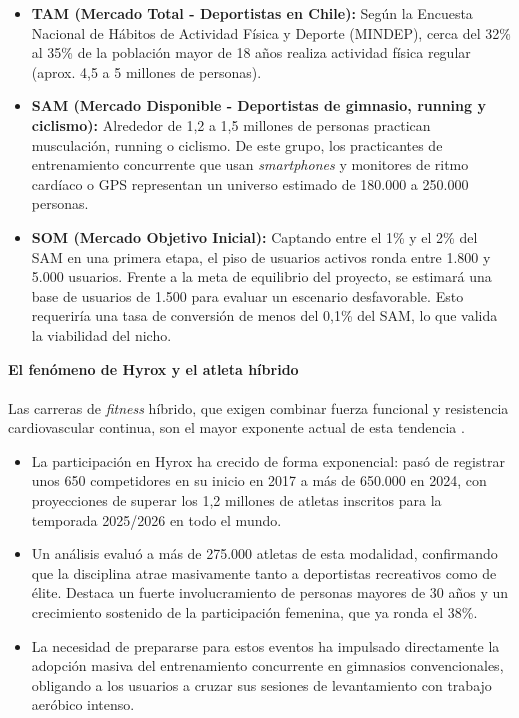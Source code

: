 \documentclass[12pt]{article}
\begin{document}
\begin{itemize}
    \item \textbf{TAM (Mercado Total - Deportistas en Chile):} Según la Encuesta Nacional de Hábitos de Actividad Física y Deporte (MINDEP), cerca del 32\% al 35\% de la población mayor de 18 años realiza actividad física regular (aprox. 4,5 a 5 millones de personas).
    \item \textbf{SAM (Mercado Disponible - Deportistas de gimnasio, running y ciclismo):} Alrededor de 1,2 a 1,5 millones de personas practican musculación, running o ciclismo. De este grupo, los practicantes de entrenamiento concurrente que usan \textit{smartphones} y monitores de ritmo cardíaco o GPS representan un universo estimado de 180.000 a 250.000 personas.
    \item \textbf{SOM (Mercado Objetivo Inicial):} Captando entre el 1\% y el 2\% del SAM en una primera etapa, el piso de usuarios activos ronda entre 1.800 y 5.000 usuarios. Frente a la meta de equilibrio del proyecto, se estimará una base de usuarios de 1.500 para evaluar un escenario desfavorable. Esto requeriría una tasa de conversión de menos del 0,1\% del SAM, lo que valida la viabilidad del nicho.
\end{itemize}

\vspace{0.3cm}
\textbf{El fenómeno de Hyrox y el atleta híbrido}
\\\\
Las carreras de \textit{fitness} híbrido, que exigen combinar fuerza funcional y resistencia cardiovascular continua, son el mayor exponente actual de esta tendencia \citep{clarin_hyrox}.

\begin{itemize}
    \item La participación en Hyrox ha crecido de forma exponencial: pasó de registrar unos 650 competidores en su inicio en 2017 a más de 650.000 en 2024, con proyecciones de superar los 1,2 millones de atletas inscritos para la temporada 2025/2026 en todo el mundo.
    \item Un análisis evaluó a más de 275.000 atletas de esta modalidad, confirmando que la disciplina atrae masivamente tanto a deportistas recreativos como de élite. Destaca un fuerte involucramiento de personas mayores de 30 años y un crecimiento sostenido de la participación femenina, que ya ronda el 38\%.
    \item La necesidad de prepararse para estos eventos ha impulsado directamente la adopción masiva del entrenamiento concurrente en gimnasios convencionales, obligando a los usuarios a cruzar sus sesiones de levantamiento con trabajo aeróbico intenso.
\end{itemize}
\end{document}
